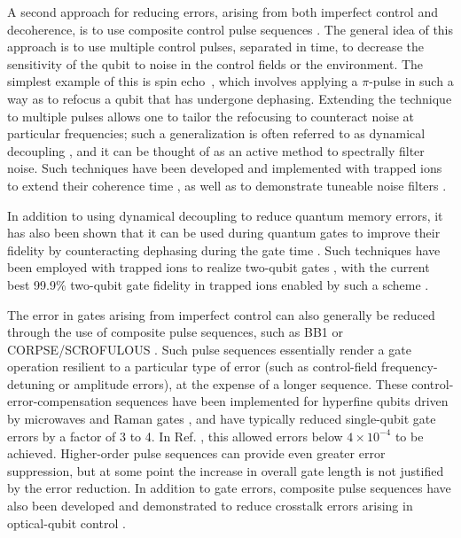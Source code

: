 \documentclass[%
reprint,
 amsmath,amssymb,
]{revtex4-1}
\begin{document}
A second approach for reducing errors, arising from both imperfect control and decoherence, is to use composite control pulse sequences \cite{MerrillCompPulseReview2014, KabytayevCompPulses2014}.  The general idea of this approach is to use multiple control pulses, separated in time, to decrease the sensitivity of the qubit to noise in the control fields or the environment.   The simplest example of this is spin echo~\cite{PhysRev.80.580}, which involves applying a $\pi$-pulse in such a way as to refocus a qubit that has undergone dephasing. Extending the technique to multiple pulses allows one to tailor the refocusing to counteract noise at particular frequencies; such a generalization is often referred to as  dynamical decoupling \cite{ViolaDynamicDecoup1998}, and it can be thought of as an active method to spectrally filter noise.  Such techniques have been developed and implemented with trapped ions to extend their coherence time \cite{BiercukDynamDecoup2009, SzwerDynamDecoup2011,Wang10MinuteCoherence2017}, as well as to demonstrate tuneable noise filters \cite{BiercukDynamDecoup2009}.

In addition to using dynamical decoupling to reduce quantum memory errors, it has also been shown that it can be used during quantum gates to improve their fidelity by counteracting dephasing during the gate time \cite{WestDynamDecoupGates2010, BermudezGate2012}. Such techniques have been employed with trapped ions to realize two-qubit gates \cite{TanDressedState2013,BallanceHybridLogic2015,manovitz2017fast}, with the current best 99.9\% two-qubit gate fidelity in trapped ions enabled by such a scheme \cite{Ballance2QubitHyperfineGate2016}.

The error in gates arising from imperfect control can also generally be reduced through the use of composite pulse sequences, such as BB1 or CORPSE/SCROFULOUS \cite{WimperisBB11994,CumminsPulseSequence2003}. Such pulse sequences essentially render a gate operation resilient to a particular type of error (such as control-field frequency-detuning or amplitude errors), at the expense of a longer sequence. These control-error-compensation sequences have been implemented for hyperfine qubits driven by microwaves \cite{TimoneyErrorResistant2008} and Raman gates \cite{MountErrorCompensation2015}, and have typically reduced single-qubit gate errors by a factor of 3 to 4. In Ref. \cite{MountErrorCompensation2015}, this allowed errors below $4 \times 10^{-4}$ to be achieved. Higher-order pulse sequences can provide even greater error suppression, but at some point the increase in overall gate length is not justified by the error reduction.  In addition to gate errors, composite pulse sequences have also been developed and demonstrated to reduce crosstalk errors arising in optical-qubit control \cite{MerrillCompCrossTalk2014, LowMethodology2016, McConnellHeisenberg2017}.
\end{document}
